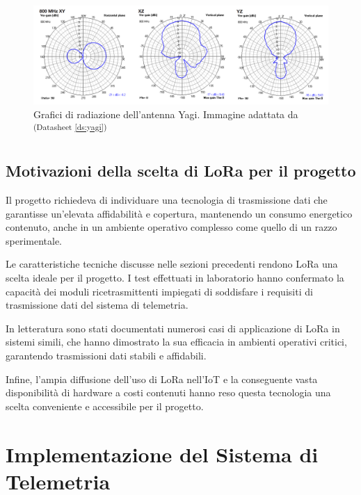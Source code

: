 \documentclass[12pt,a4paper,twoside]{book}
\newcommand{\dsref}[1]{\textsuperscript{(Datasheet \ref{#1})}}
\begin{document}
\begin{figure}[H]
    \centering
    \includegraphics[width=\textwidth]{img/yagi-rad-plot.png}
    \caption[Grafici di radiazione dell'antenna Yagi]%
    {Grafici di radiazione dell'antenna Yagi. \tiny{Immagine adattata da \dsref{ds:yagi}}}%
    \label{fig:yagi-rad-plot}
\end{figure}

\section{Motivazioni della scelta di \texorpdfstring{LoRa\textsuperscript{\textcopyright}}{} per il progetto}
Il progetto richiedeva di individuare una tecnologia di trasmissione dati che garantisse
un'elevata affidabilità e copertura, mantenendo un consumo energetico contenuto,
anche in un ambiente operativo complesso come quello di un razzo sperimentale.

Le caratteristiche tecniche discusse nelle sezioni precedenti rendono \ac{LoRa}
una scelta ideale per il progetto.
I test effettuati in laboratorio hanno confermato la capacità dei moduli
ricetrasmittenti impiegati di soddisfare i requisiti di trasmissione dati del
sistema di telemetria.

In letteratura sono stati documentati numerosi casi di applicazione di \ac{LoRa}
in sistemi simili\cite{Misbahuddin2022, Ma2024}, che hanno dimostrato la sua
efficacia in ambienti operativi critici, garantendo trasmissioni dati stabili e
affidabili.

Infine, l'ampia diffusione dell'uso di \ac{LoRa} nell'\ac{IoT} e la conseguente
vasta disponibilità di hardware a costi contenuti hanno reso questa tecnologia
una scelta conveniente e accessibile per il progetto.

\chapter{Implementazione del Sistema di Telemetria} \label{chap:telemetry}
\end{document}
